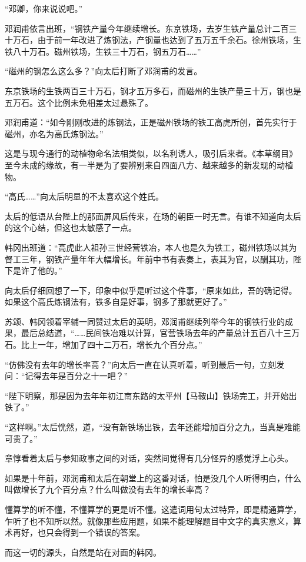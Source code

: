 “邓卿，你来说说吧。”

邓润甫依言出班，“钢铁产量今年继续增长。东京铁场，去岁生铁产量总计二百三十万石，由于前一年改进了炼钢法，产钢量也达到了五万五千余石。徐州铁场，生铁八十万石。磁州铁场，生铁三十万石，钢五万石……”

“磁州的钢怎么这么多？”向太后打断了邓润甫的发言。

东京铁场的生铁两百三十万石，钢才五万多石，而磁州的生铁产量三十万，钢也是五万石。这个比例未免相差太过悬殊了。

邓润甫道：“如今刚刚改进的炼钢法，正是磁州铁场的铁工高虎所创，首先实行于磁州，亦名为高氏炼钢法。”

这是与现今通行的动植物命名法相类似，以名利诱人，吸引后来者。《本草纲目》至今未成的缘故，有一半是为了要辨别来自四面八方、越来越多的新发现的动植物。

“高氏……”向太后明显的不太喜欢这个姓氏。

太后的低语从台陛上的那面屏风后传来，在场的朝臣一时无言。有谁不知道向太后的这个心结，但这也太敏感了一点。

韩冈出班道：“高虎此人祖孙三世经营铁冶，本人也是久为铁工，磁州铁场以其为督工三年，钢铁产量年年大幅增长。年前中书有表奏上，表其为官，以酬其功，陛下是许了他的。”

向太后仔细回想了一下，印象中似乎是听过这个件事，“原来如此，吾的确记得。如果这个高氏炼钢法有，铁多自是好事，钢多了那就更好了。”

苏颂、韩冈领着宰辅一同赞过太后的英明，邓润甫继续列举今年的钢铁行业的成果，最后总结道，“……民间铁冶难以计算，官营铁场去年的产量总计五百八十三万石。比上一年，增加了四十二万石，增长九个百分点。”

“仿佛没有去年的增长率高？”向太后一直在认真听着，听到最后一句，立刻发问：“记得去年是百分之十一吧？”

“陛下明察，那是因为去年年初江南东路的太平州【马鞍山】铁场完工，并开始出铁了。”

“这样啊。”太后恍然，道，“没有新铁场出铁，去年还能增加百分之九，当真是难能可贵了。”

章惇看着太后与参知政事之间的对话，突然间觉得有几分怪异的感觉浮上心头。

如果是十年前，邓润甫和太后在朝堂上的这番对话，怕是没几个人听得明白，什么叫做增长了九个百分点？什么叫做没有去年的增长率高？

懂算学的听不懂，不懂算学的更是听不懂。这遣词用句太过特异，即是精通算学，乍听了也不知所以然。就像那些应用题，如果不能理解题目中文字的真实意义，算术再好，也只会得到一个错误的答案。

而这一切的源头，自然是站在对面的韩冈。

